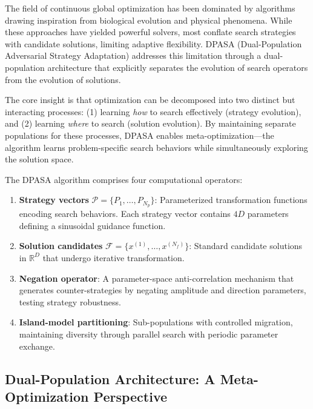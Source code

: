 \documentclass[11pt]{article}
\begin{document}

The field of continuous global optimization has been dominated by algorithms drawing inspiration from biological evolution and physical phenomena. While these approaches have yielded powerful solvers, most conflate search strategies with candidate solutions, limiting adaptive flexibility. DPASA (Dual-Population Adversarial Strategy Adaptation) addresses this limitation through a dual-population architecture that explicitly separates the evolution of search operators from the evolution of solutions.

The core insight is that optimization can be decomposed into two distinct but interacting processes: (1) learning \textit{how} to search effectively (strategy evolution), and (2) learning \textit{where} to search (solution evolution). By maintaining separate populations for these processes, DPASA enables meta-optimization---the algorithm learns problem-specific search behaviors while simultaneously exploring the solution space.


The DPASA algorithm comprises four computational operators:
\begin{enumerate}
    \item \textbf{Strategy vectors} $\mathcal{P} = \{P_1, \ldots, P_{N_p}\}$: Parameterized transformation functions encoding search behaviors. Each strategy vector contains $4D$ parameters defining a sinusoidal guidance function.
    \item \textbf{Solution candidates} $\mathcal{F} = \{x^{(1)}, \ldots, x^{(N_f)}\}$: Standard candidate solutions in $\mathbb{R}^D$ that undergo iterative transformation.
    \item \textbf{Negation operator}: A parameter-space anti-correlation mechanism that generates counter-strategies by negating amplitude and direction parameters, testing strategy robustness.
    \item \textbf{Island-model partitioning}: Sub-populations with controlled migration, maintaining diversity through parallel search with periodic parameter exchange.
\end{enumerate}

\subsection{Dual-Population Architecture: A Meta-Optimization Perspective}
\end{document}
